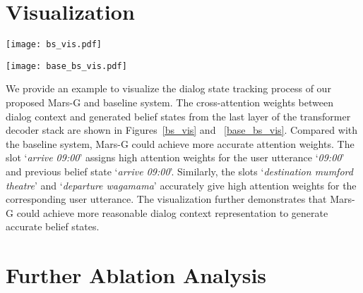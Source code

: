 \section{Visualization}
\label{app:vis}
\begin{figure*}[ht]
  \centering
  \texttt{[image: bs\_vis.pdf]}
  \caption{Visualization of the cross-attention weights between dialog context and generated belief states for our proposed Mars-G. The horizontal axis is the dialog context, and the vertical axis is the generated belief state.}
  \label{bs_vis}
\end{figure*}
\begin{figure*}[ht]
  \centering
  \texttt{[image: base\_bs\_vis.pdf]}
  \caption{Visualization of the cross-attention weights between dialog context and generated belief states for the baseline system.}
  \label{base_bs_vis}
\end{figure*}
We provide an example to visualize the   dialog state tracking process of our proposed Mars-G and baseline system. The cross-attention weights between dialog context and generated belief states from the last layer of the transformer decoder stack  are shown in Figures~\ref{bs_vis} and ~\ref{base_bs_vis}.  Compared with the baseline system,  Mars-G could achieve more accurate attention weights.
The slot `\textit{arrive 09:00}' assigns high attention weights for the user utterance `\textit{09:00}' and previous belief state `\textit{arrive 09:00}'. Similarly, the slots `\textit{destination mumford theatre}' and  `\textit{departure wagamama}' accurately give  high attention weights for the corresponding user utterance.   The visualization further demonstrates that Mars-G could achieve  more reasonable dialog context representation to generate accurate belief states.

\section{Further Ablation Analysis}
\label{app:sim}

